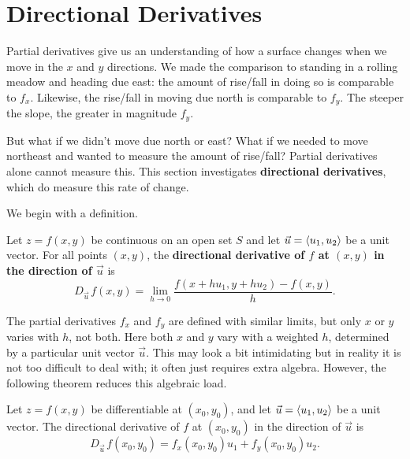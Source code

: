 \section{Directional Derivatives}\label{sec:directional_derivative}

Partial derivatives give us an understanding of how a surface changes when we move in the $x$ and $y$ directions. We made the comparison to standing in a rolling meadow and heading due east: the amount of rise/fall in doing so is comparable to $f_x$. Likewise, the rise/fall in  moving due north is comparable to $f_y$. The steeper the slope, the greater in magnitude $f_y$.

But what if we didn't move due north or east? What if we needed to move northeast and wanted to measure the amount of rise/fall? Partial derivatives alone cannot measure this. This section investigates \textbf{directional derivatives}, which do measure this rate of change. 

We begin with a definition.

\begin{definition}\label{def:direct_deriv}%
Let $z=f(x,y)$ be continuous on an open set $S$ and let $\vec u =\left\langle u_1,u_2\right\rangle$ be a unit vector. For all points $(x,y)$, the \textbf{directional derivative of $f$ at $(x,y)$ in the direction of $\vec u$} is
\[D_{\vec u\,}f(x,y) = \lim_{h\to 0} \frac{f(x+hu_1,y+hu_2) - f(x,y)}h.\]
\end{definition}

The partial derivatives $f_x$ and $f_y$ are defined with similar limits, but only $x$ or $y$ varies with $h$, not both. Here both $x$ and $y$ vary with a weighted $h$, determined by a particular unit vector $\vec u$. This may look a bit intimidating but in reality it is not too difficult to deal with; it often just requires extra algebra. However, the following theorem reduces this algebraic load.

\begin{theorem}\label{thm:direct_deriv1}%
Let $z=f(x,y)$ be differentiable at $(x_0,y_0)$, and let $\vec u =\left\langle u_1,u_2\right\rangle$ be a unit vector. The directional derivative of $f$ at $(x_0,y_0)$ in the direction of $\vec u$ is
\[D_{\vec u\,}f(x_0,y_0)=f_x(x_0,y_0)u_1 + f_y(x_0,y_0)u_2.\]
\end{theorem}

